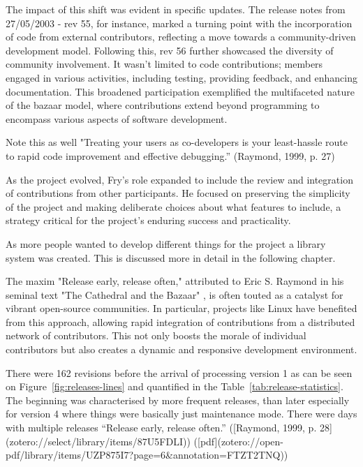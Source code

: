 The impact of this shift was evident in specific updates. The release notes from 27/05/2003 - rev 55, for instance, marked a turning point with the incorporation of code from external contributors, reflecting a move towards a community-driven development model. Following this, rev 56 further showcased the diversity of community involvement. It wasn't limited to code contributions; members engaged in various activities, including testing, providing feedback, and enhancing documentation. This broadened participation exemplified the multifaceted nature of the bazaar model, where contributions extend beyond programming to encompass various aspects of software development.

Note this as well "Treating your users as co-developers is your least-hassle route to rapid code improvement and effective debugging.” (Raymond, 1999, p. 27)

As the project evolved, Fry's role expanded to include the review and integration of contributions from other participants. He focused on preserving the simplicity of the project and making deliberate choices about what features to include, a strategy critical for the project's enduring success and practicality. \parencite{Processing4CONTRIBUTINGMd}

As more people wanted to develop different things for the project a library system was created. This is discussed more in detail in the following chapter. 

The maxim "Release early, release often," attributed to Eric S. Raymond in his seminal text "The Cathedral and the Bazaar" \parencite{raymondCathedralBazaar1999}, is often touted as a catalyst for vibrant open-source communities. In particular, projects like Linux have benefited from this approach, allowing rapid integration of contributions from a distributed network of contributors. This not only boosts the morale of individual contributors but also creates a dynamic and responsive development environment.

There were 162 revisions before the arrival of processing version 1 as can be seen on Figure~\ref{fig:releases-lines} and quantified in the Table~\ref{tab:release-statistics}. The beginning was characterised by more frequent releases, than later especially for version 4 where things were basically just maintenance mode. There were days with multiple releases “Release early, release often.” ([Raymond, 1999, p. 28](zotero://select/library/items/87U5FDLI)) ([pdf](zotero://open-pdf/library/items/UZP875I7?page=6&annotation=FTZT2TNQ))

